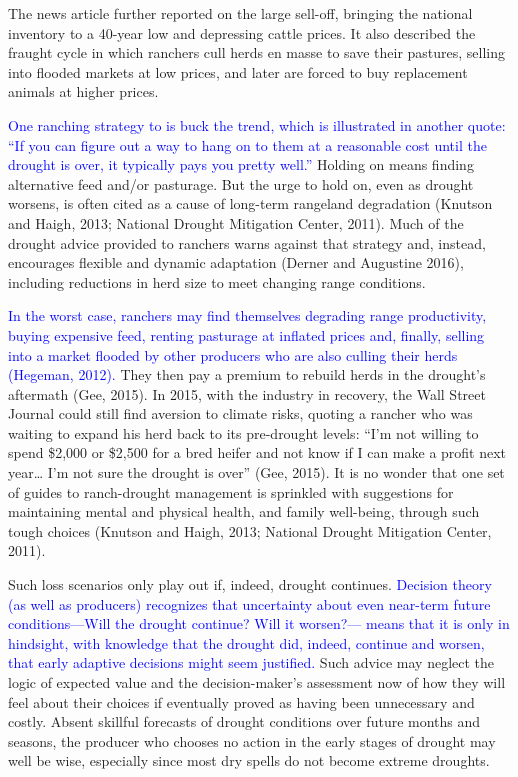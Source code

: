 \documentclass[11pt]{article}
\begin{document}
The news article further reported on the large sell-off, bringing the national inventory to a 40-year low and depressing cattle prices. It also described the fraught cycle in which ranchers cull herds en masse to save their pastures, selling into flooded markets at low prices, and later are forced to buy replacement animals at higher prices. 

\textcolor{blue}{One ranching strategy to is buck the trend, which is illustrated in another quote: ``If you can figure out a way to hang on to them at a reasonable cost until the drought is over, it typically pays you pretty well.''} Holding on means finding alternative feed and/or pasturage. But the urge to hold on, even as drought worsens, is often cited as a cause of long-term rangeland degradation (Knutson and Haigh, 2013; National Drought Mitigation Center, 2011). Much of the drought advice provided to ranchers warns against that strategy and, instead, encourages flexible and dynamic adaptation (Derner and Augustine 2016), including reductions in herd size to meet changing range conditions. 

\textcolor{blue}{In the worst case, ranchers may find themselves degrading range productivity, buying expensive feed, renting pasturage at inflated prices and, finally, selling into a market flooded by other producers who are also culling their herds (Hegeman, 2012).} They then pay a premium to rebuild herds in the drought’s aftermath (Gee, 2015). In 2015, with the industry in recovery, the Wall Street Journal could still find aversion to climate risks, quoting a rancher who was waiting to expand his herd back to its pre-drought levels: ``I’m not willing to spend \$2,000 or \$2,500 for a bred heifer and not know if I can make a profit next year… I’m not sure the drought is over'' (Gee, 2015). It is no wonder that one set of guides to ranch-drought management is sprinkled with suggestions for maintaining mental and physical health, and family well-being, through such tough choices (Knutson and Haigh, 2013; National Drought Mitigation Center, 2011). 

Such loss scenarios only play out if, indeed, drought continues. \textcolor{blue}{Decision theory (as well as producers) recognizes that uncertainty about even near-term future conditions—Will the drought continue? Will it worsen?— means that it is only in hindsight, with knowledge that the drought did, indeed, continue and worsen, that early adaptive decisions might seem justified.} Such advice may neglect the logic of expected value and the decision-maker’s assessment now of how they will feel about their choices if eventually proved as having been unnecessary and costly.
Absent skillful forecasts of drought conditions over future months and seasons, the producer who chooses no action in the early stages of drought may well be wise, especially since most dry spells do not become extreme droughts.  
\end{document}
